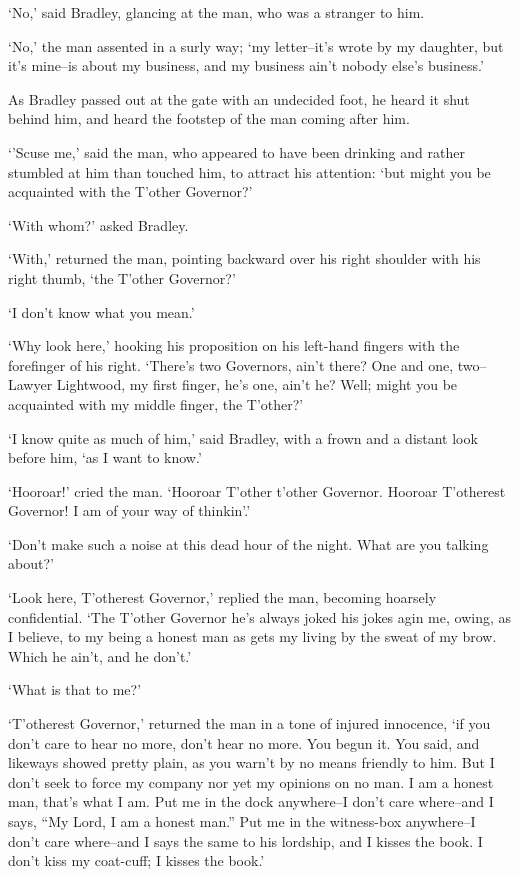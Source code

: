 ‘No,’ said Bradley, glancing at the man, who was a stranger to him.

‘No,’ the man assented in a surly way; ‘my letter--it’s wrote by my
daughter, but it’s mine--is about my business, and my business ain’t
nobody else’s business.’

As Bradley passed out at the gate with an undecided foot, he heard it
shut behind him, and heard the footstep of the man coming after him.

‘’Scuse me,’ said the man, who appeared to have been drinking and rather
stumbled at him than touched him, to attract his attention: ‘but might
you be acquainted with the T’other Governor?’

‘With whom?’ asked Bradley.

‘With,’ returned the man, pointing backward over his right shoulder with
his right thumb, ‘the T’other Governor?’

‘I don’t know what you mean.’

‘Why look here,’ hooking his proposition on his left-hand fingers with
the forefinger of his right. ‘There’s two Governors, ain’t there? One
and one, two--Lawyer Lightwood, my first finger, he’s one, ain’t he?
Well; might you be acquainted with my middle finger, the T’other?’

‘I know quite as much of him,’ said Bradley, with a frown and a distant
look before him, ‘as I want to know.’

‘Hooroar!’ cried the man. ‘Hooroar T’other t’other Governor. Hooroar
T’otherest Governor! I am of your way of thinkin’.’

‘Don’t make such a noise at this dead hour of the night. What are you
talking about?’

‘Look here, T’otherest Governor,’ replied the man, becoming hoarsely
confidential. ‘The T’other Governor he’s always joked his jokes agin me,
owing, as I believe, to my being a honest man as gets my living by the
sweat of my brow. Which he ain’t, and he don’t.’

‘What is that to me?’

‘T’otherest Governor,’ returned the man in a tone of injured innocence,
‘if you don’t care to hear no more, don’t hear no more. You begun it.
You said, and likeways showed pretty plain, as you warn’t by no means
friendly to him. But I don’t seek to force my company nor yet my
opinions on no man. I am a honest man, that’s what I am. Put me in the
dock anywhere--I don’t care where--and I says, “My Lord, I am a honest
man.” Put me in the witness-box anywhere--I don’t care where--and I
says the same to his lordship, and I kisses the book. I don’t kiss my
coat-cuff; I kisses the book.’

